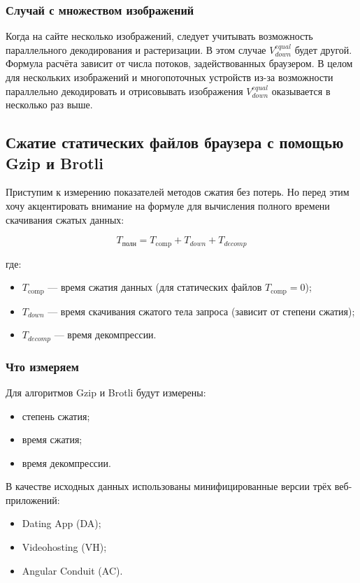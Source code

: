 \documentclass[12pt]{article}
\begin{document}
\subsubsection{Случай с множеством изображений}

Когда на сайте несколько изображений, следует учитывать возможность параллельного декодирования и растеризации.
В этом случае $V^{equal}_{down}$ будет другой. Формула расчёта зависит от числа потоков, задействованных браузером.
В целом для нескольких изображений и многопоточных устройств из-за возможности параллельно декодировать
и отрисовывать изображения $V^{equal}_{down}$ оказывается в несколько раз выше.

\subsection{Сжатие статических файлов браузера с помощью Gzip и Brotli}

Приступим к измерению показателей методов сжатия без потерь. Но перед этим хочу акцентировать внимание на
формуле для вычисления полного времени скачивания сжатых данных:

\begin{equation}
    T_{\text{полн}} = T_{\text{comp}} + T_{down} + T_{decomp}
\end{equation}

где:
\begin{itemize}
    \item $T_{\text{comp}}$ — время сжатия данных (для статических файлов $T_{\text{comp}} = 0$);
    \item $T_{down}$ — время скачивания сжатого тела запроса (зависит от степени сжатия);
    \item $T_{decomp}$ — время декомпрессии.
\end{itemize}

\subsubsection{Что измеряем}

Для алгоритмов Gzip и Brotli будут измерены:
\begin{itemize}[label=-]
    \item степень сжатия;
    \item время сжатия;
    \item время декомпрессии.
\end{itemize}

В качестве исходных данных использованы минифицированные версии трёх веб-приложений:
\begin{itemize}[label=-]
    \item Dating App (DA);
    \item Videohosting (VH);
    \item Angular Conduit (AC).
\end{itemize}
\end{document}

